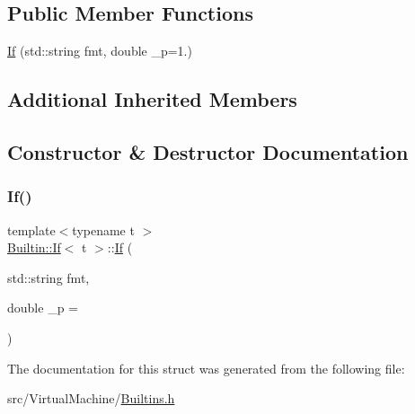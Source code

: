 \subsection*{Public Member Functions}
\begin{DoxyCompactItemize}
\item 
\hyperlink{struct_builtin_1_1_if_a4ea649fb18a5c42445c5c48e8549c951}{If} (std\+::string fmt, double \+\_\+p=1.)
\end{DoxyCompactItemize}
\subsection*{Additional Inherited Members}


\subsection{Constructor \& Destructor Documentation}
\mbox{\label{struct_builtin_1_1_if_a4ea649fb18a5c42445c5c48e8549c951}} 
\subsubsection{\texorpdfstring{If()}{If()}}
{\footnotesize\ttfamily template$<$typename t $>$ \\
\hyperlink{struct_builtin_1_1_if}{Builtin\+::\+If}$<$ t $>$\+::\hyperlink{struct_builtin_1_1_if}{If} (\begin{DoxyParamCaption}\item[{std\+::string}]{fmt,  }\item[{double}]{\+\_\+p = {} }\end{DoxyParamCaption})\hspace{0.3cm}{\ttfamily [inline]}}



The documentation for this struct was generated from the following file\+:\begin{DoxyCompactItemize}
\item 
src/\+Virtual\+Machine/\hyperlink{_builtins_8h}{Builtins.\+h}\end{DoxyCompactItemize}
